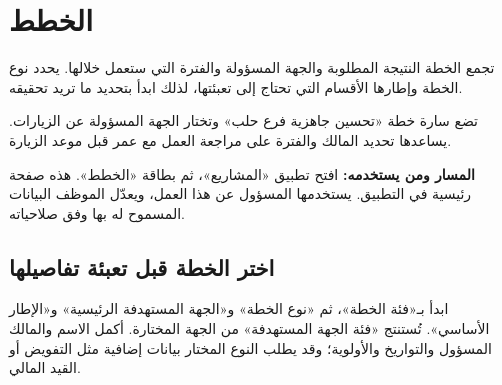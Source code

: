 
\clearpage
\section{الخطط}
\label{sec:projects-feature-plans}

تجمع الخطة النتيجة المطلوبة والجهة المسؤولة والفترة التي ستعمل خلالها. يحدد نوع الخطة وإطارها الأقسام التي تحتاج إلى تعبئتها، لذلك ابدأ بتحديد ما تريد تحقيقه.

\begin{rcnote}
تضع سارة خطة «تحسين جاهزية فرع حلب» وتختار الجهة المسؤولة عن الزيارات. يساعدها تحديد المالك والفترة على مراجعة العمل مع عمر قبل موعد الزيارة.
\end{rcnote}

\textbf{المسار ومن يستخدمه:} افتح تطبيق «المشاريع»، ثم بطاقة «الخطط». هذه صفحة رئيسية في التطبيق. يستخدمها المسؤول عن هذا العمل، ويعدّل الموظف البيانات المسموح له بها وفق صلاحياته.

\subsection{اختر الخطة قبل تعبئة تفاصيلها}
ابدأ بـ«فئة الخطة»، ثم «نوع الخطة» و«الجهة المستهدفة الرئيسية» و«الإطار الأساسي». تُستنتج «فئة الجهة المستهدفة» من الجهة المختارة. أكمل الاسم والمالك المسؤول والتواريخ والأولوية؛ وقد يطلب النوع المختار بيانات إضافية مثل التفويض أو القيد المالي.

